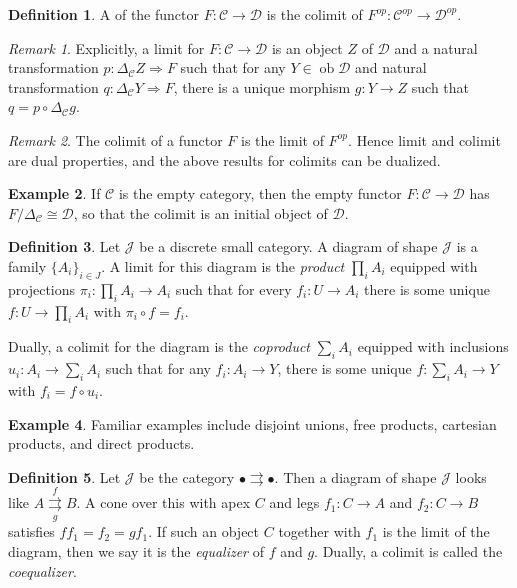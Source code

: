 \documentclass[10pt,letterpaper,cm]{nupset}
\theoremstyle{definition}
\newtheorem{definition}{Definition}
\newtheorem{exmp}[definition]{Example}
\theoremstyle{theorem}
\theoremstyle{remark}
\newtheorem{remark}{Remark}
\newcommand{\1}{\mathbf{1}}
\renewcommand{\c}{\mathscr{C}}
\renewcommand{\d}{\mathscr{D}}
\renewcommand{\j}{\mathscr{J}}
\newcommand{\0}{\vec 0}
\DeclareMathOperator{\ob}{ob}
\begin{document}
\begin{definition}
A  of the functor $F: \c \to \d$ is the colimit of $F^{op} : \c^{op} \to \d^{op}$.
\end{definition}

\begin{remark}
Explicitly,  a limit for $F: \c \to \d$ is an object $Z$ of $\d$ and a natural transformation $p: \Delta_{\c}Z \Rightarrow F$ such that for any $Y \in \ob \d$ and natural transformation $q: \Delta_{\c}Y \Rightarrow F$, there is a unique morphism $g: Y \to Z$ such that $ q= p \circ \Delta_{\c}g$.
\end{remark}

\begin{remark}
The colimit of a functor $F$ is the limit of $F^{op}$. Hence limit and colimit are dual properties, and the above results for colimits can be dualized.
\end{remark}

\begin{exmp}
If $\c$ is the empty category, then the empty functor $F: \c \to \d$ has $F/\Delta_{\c}\cong \d$, so that the colimit is an initial object of $\d$.
\end{exmp}

\begin{definition}
Let $\j$ be a discrete small category. A diagram of shape $\j$ is a family $\{A_i\}_{i\in J}$. A limit for this diagram is the \textit{product} $\prod_i A_i$ equipped with projections $\pi_i : \prod_i A_i \to A_i$ such that for every $f_{i} : U \to A_i$ there is some unique $f: U \to \prod_i A_i$ with $\pi_i \circ f = f_i$. 

\medskip

 Dually, a colimit for the diagram is the \textit{coproduct} $\sum_i A_i$ equipped with inclusions $u_i : A_i \to \sum_i A_i$ such that for any $f_i : A_i \to Y$, there is some unique $f : \sum_i A_i \to Y$ with $f_i = f \circ u_i$.
\end{definition}

\begin{exmp}
Familiar examples include disjoint unions, free products, cartesian products, and direct products. 
\end{exmp}

\begin{definition}
Let $\j$ be the category $\bullet \rightrightarrows \bullet$. Then  a diagram of shape $\j$ looks like $A \overset{f}{\underset{g}{\rightrightarrows}} B$. A cone over this with apex $C$ and legs $f_1 : C \to A$ and $f_2 : C \to B$ satisfies $ff_1=f_2 = gf_1$. If such an object $C$ together with $f_1$ is the limit of the diagram, then we say it is the \textit{equalizer} of $f$ and $g$. Dually, a colimit is called the \textit{coequalizer}.
\end{definition}
\end{document}

